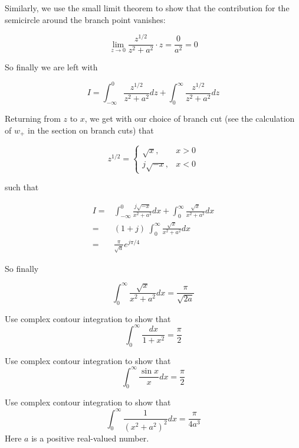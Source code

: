 Similarly, we use the small limit theorem to show that the contribution for the
semicircle around the branch point vanishes:

\begin{equation}
\lim_{z \to 0}\frac{z^{1/2}}{z^2+a^2} \cdot z = \frac{0}{a^2} = 0
\end{equation}

So finally we are left with

\begin{equation}
I = \int_{- \infty}^{0}\frac{z^{1/2}}{z^2+a^2}dz + \int_{0}^{\infty}\frac{z^{1/2}}{z^2+a^2}dz
\end{equation} 

Returning from $z$ to $x$, we get with our choice of branch cut (see the
calculation of $w_+$ in the section on branch cuts) that 

\begin{equation}
z^{1/2} = 
\begin{cases}
\sqrt{x}, & x > 0\\
j \sqrt{-x}, & x < 0
\end{cases}
\end{equation} 

such that

\begin{align}
I = & \int_{- \infty}^{0}\frac{j\sqrt{-x}}{x^2+a^2}dx +
\int_{0}^{\infty}\frac{\sqrt{x}}{x^2+a^2}dx \nonumber \\
 = & (1 + j) \ \int_{0}^{\infty}\frac{\sqrt{x}}{x^2+a^2}dx \nonumber \\
 = & \frac{\pi}{\sqrt{a}} e^{j \pi /4}
\end{align} 

So finally

\begin{equation}
\int_0^{\infty}\frac{\sqrt{x}}{x^2+a^2}dx = \frac{\pi}{\sqrt{2a}}
\end{equation}


\begin{exer}
Use complex contour integration to show that
$$ \int_0^{\infty} \frac{dx}{1+x^2} = \frac{\pi}{2}$$
\end{exer}

\begin{exer}
Use complex contour integration to show that
$$ \int_0^{\infty} \frac{\sin x}{x} dx = \frac{\pi}{2}$$
\end{exer}

\begin{exer}
Use complex contour integration to show that
$$ \int_0^{\infty} \frac{1}{\left(x^2 + a^2\right)^2} dx = \frac{\pi}{4 a^3}$$
Here $a$ is a positive real-valued number.
\end{exer}

